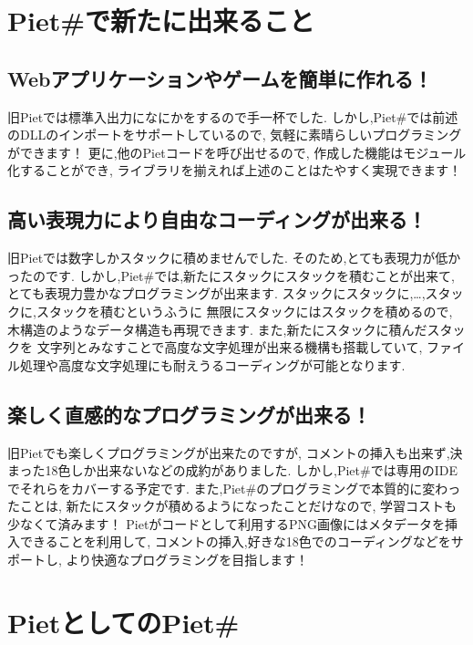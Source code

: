 \section{Piet\#で新たに出来ること}

\subsection{Webアプリケーションやゲームを簡単に作れる！}

旧Pietでは標準入出力になにかをするので手一杯でした.
しかし,Piet\#では前述のDLLのインポートをサポートしているので,
気軽に素晴らしいプログラミングができます！
更に,他のPietコードを呼び出せるので,
作成した機能はモジュール化することができ,
ライブラリを揃えれば上述のことはたやすく実現できます！

\subsection{高い表現力により自由なコーディングが出来る！}

旧Pietでは数字しかスタックに積めませんでした.
そのため,とても表現力が低かったのです.
しかし,Piet\#では,新たにスタックにスタックを積むことが出来て,
とても表現力豊かなプログラミングが出来ます.
スタックにスタックに,\ldots{},スタックに,スタックを積むというふうに
無限にスタックにはスタックを積めるので,
木構造のようなデータ構造も再現できます.
また,新たにスタックに積んだスタックを
文字列とみなすことで高度な文字処理が出来る機構も搭載していて,
ファイル処理や高度な文字処理にも耐えうるコーディングが可能となります.

\subsection{楽しく直感的なプログラミングが出来る！}

旧Pietでも楽しくプログラミングが出来たのですが,
コメントの挿入も出来ず,決まった18色しか出来ないなどの成約がありました.
しかし,Piet\#では専用のIDEでそれらをカバーする予定です.
また,Piet\#のプログラミングで本質的に変わったことは,
新たにスタックが積めるようになったことだけなので,
学習コストも少なくて済みます！
Pietがコードとして利用するPNG画像にはメタデータを挿入できることを利用して,
コメントの挿入,好きな18色でのコーディングなどをサポートし,
より快適なプログラミングを目指します！

\section{PietとしてのPiet\#}


